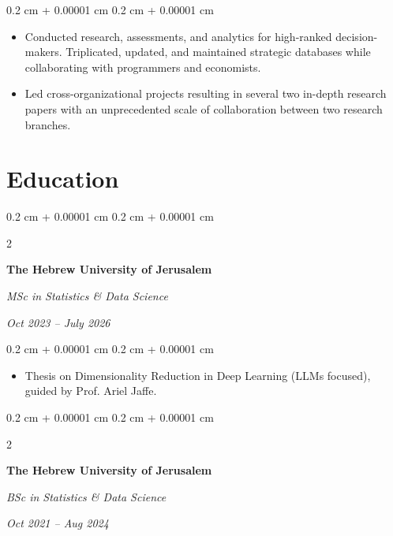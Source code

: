 \documentclass[10pt, letterpaper]{article}
\newenvironment{highlights}{
    \begin{itemize}[
        topsep=0.10 cm,
        parsep=0.8 cm,
        partopsep=0pt,
        itemsep=0pt,
        leftmargin=0.4 cm + 10pt
    ]
}{
    \end{itemize}
} %
\newenvironment{onecolentry}{
    \begin{adjustwidth}{
        0.2 cm + 0.00001 cm
    }{
        0.2 cm + 0.00001 cm
    }
}{
    \end{adjustwidth}
} %
\newenvironment{twocolentry}[2][]{
    \onecolentry
    \def\secondColumn{#2}
    \setcolumnwidth{\fill, 4.5 cm}
    \begin{paracol}{2}
}{
    \switchcolumn \raggedleft \secondColumn
    \end{paracol}
    \endonecolentry
} %
\begin{document}
        \vspace{0.10 cm}
        \begin{onecolentry}
            \begin{highlights}
                \item Conducted research, assessments, and analytics for high-ranked decision-makers. Triplicated, updated, and maintained strategic databases while collaborating with programmers and economists.
                \item Led cross-organizational projects resulting in several two in-depth research papers with an unprecedented scale of collaboration between two research branches.
            \end{highlights}
        \end{onecolentry}



    
    \section{Education}



        
        \begin{twocolentry}{
            
            
        \textit{Oct 2023 – July 2026}}
            \textbf{The Hebrew University of Jerusalem}

            \textit{MSc in Statistics \& Data Science}
        \end{twocolentry}

        \vspace{0.10 cm}
        \begin{onecolentry}
            \begin{highlights}
                \item Thesis on Dimensionality Reduction in Deep Learning (LLMs focused), guided by Prof. Ariel Jaffe.
            \end{highlights}
        \end{onecolentry}


        \vspace{0.2 cm}

        \begin{twocolentry}{
            
            
        \textit{Oct 2021 – Aug 2024}}
            \textbf{The Hebrew University of Jerusalem}

            \textit{BSc in Statistics \& Data Science}
        \end{twocolentry}
\end{document}
